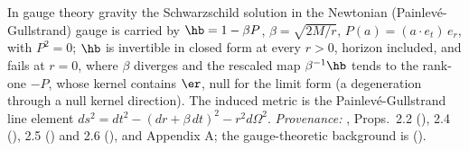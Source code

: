 In gauge theory gravity the Schwarzschild solution in the Newtonian (Painlev\'e-Gullstrand) gauge is carried by $\hb = 1 - \beta P$, $\beta = \sqrt{2M/r}$, $P(a) = (a \cdot e_t)\,e_r$, with $P^2 = 0$; $\hb$ is invertible in closed form at every $r > 0$, horizon included, and fails at $r = 0$, where $\beta$ diverges and the rescaled map $\beta^{-1}\hb$ tends to the rank-one $-P$, whose kernel contains $\er$, null for the limit form (a degeneration through a null kernel direction). The induced metric is the Painlev\'e-Gullstrand line element $ds^2 = dt^2 - (dr + \beta\,dt)^2 - r^2 d\Omega^2$. \emph{Provenance:} \cite{ButlerT5}, Props.~2.2 (), 2.4 (), 2.5 () and 2.6 (), and Appendix A; the gauge-theoretic background is \cite{DoranLasenby2003} ().
